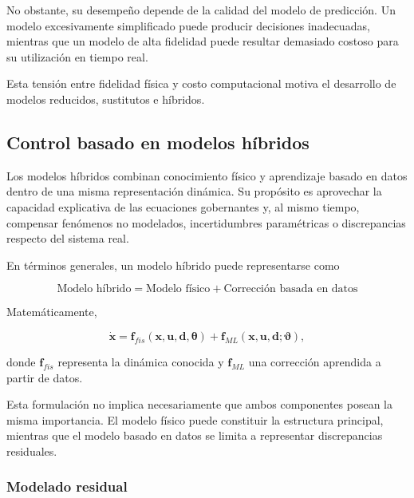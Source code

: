 No obstante, su desempeño depende de la calidad del modelo de predicción. Un modelo excesivamente simplificado puede producir decisiones inadecuadas, mientras que un modelo de alta fidelidad puede resultar demasiado costoso para su utilización en tiempo real.

Esta tensión entre fidelidad física y costo computacional motiva el desarrollo de modelos reducidos, sustitutos e híbridos.

\subsection{Control basado en modelos híbridos}
\label{subsec:control_modelos_hibridos}

Los modelos híbridos combinan conocimiento físico y aprendizaje basado en datos dentro de una misma representación dinámica. Su propósito es aprovechar la capacidad explicativa de las ecuaciones gobernantes y, al mismo tiempo, compensar fenómenos no modelados, incertidumbres paramétricas o discrepancias respecto del sistema real.

En términos generales, un modelo híbrido puede representarse como

\begin{equation}
\boxed{
\text{Modelo híbrido}
=
\text{Modelo físico}
+
\text{Corrección basada en datos}
}
\end{equation}

Matemáticamente,

\begin{equation}
\dot{\mathbf{x}}
=
\mathbf{f}_{fis}
\left(
\mathbf{x},
\mathbf{u},
\mathbf{d},
\boldsymbol{\theta}
\right)
+
\mathbf{f}_{ML}
\left(
\mathbf{x},
\mathbf{u},
\mathbf{d};
\boldsymbol{\vartheta}
\right),
\label{eq:modelo_hibrido_dinamico}
\end{equation}

donde $\mathbf{f}_{fis}$ representa la dinámica conocida y $\mathbf{f}_{ML}$ una corrección aprendida a partir de datos.

Esta formulación no implica necesariamente que ambos componentes posean la misma importancia. El modelo físico puede constituir la estructura principal, mientras que el modelo basado en datos se limita a representar discrepancias residuales.

\subsubsection{Modelado residual}


